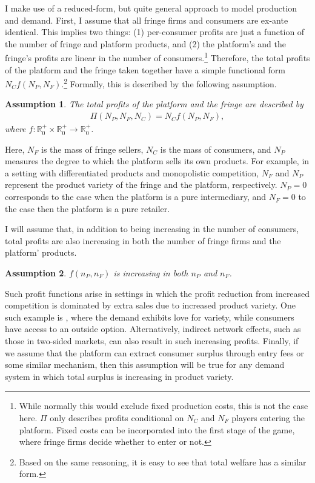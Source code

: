 \documentclass[a4paper]{article}
\newtheorem{assumption}{Assumption}
\begin{document}
I make use of a reduced-form, but quite general approach to model production and demand.
First, I assume that all fringe firms and consumers are ex-ante identical.
This implies two things: (1) per-consumer profits are just a function of the number of fringe and platform products, and (2) the platform's and the fringe's profits are linear in the number of consumers.\footnote{
    While normally this would exclude fixed production costs, this is not the case here.
    $\Pi$ only describes profits conditional on $N_C$ and $N_F$ players entering the platform.
    Fixed costs can be incorporated into the first stage of the game, where fringe firms decide whether to enter or not.
}
Therefore, the total profits of the platform and the fringe taken together have a simple functional form $N_C f(N_P, N_F)$.\footnote{
    Based on the same reasoning, it is easy to see that total welfare has a similar form.
}
Formally, this is described by the following assumption.
\begin{assumption}
    \label{ass:identical_fringe}
    The total profits of the platform and the fringe are described by 
    \begin{align*}
        \Pi(N_P, N_F, N_C) = N_C f(N_P, N_F),
    \end{align*}
    where $f: \mathbb{R}^+_0 \times \mathbb{R}^+_0 \to \mathbb{R}^+_0$.
\end{assumption}
Here, $N_F$ is the mass of fringe sellers, $N_C$ is the mass of consumers, and $N_P$ measures the degree to which the platform sells its own products.
For example, in a setting with differentiated products and monopolistic competition, $N_F$ and $N_P$ represent the product variety of the fringe and the platform, respectively.
$N_P = 0$ corresponds to the case when the platform is a pure intermediary, and $N_F = 0$ to the case then the platform is a pure retailer.

I will assume that, in addition to being increasing in the number of consumers, total profits are also increasing in both the number of fringe firms and the platform' products.
\begin{assumption}
    \label{ass:monotone_profits}
    $f(n_P, n_F)$ is increasing in both $n_P$ and $n_F$.
\end{assumption}
Such profit functions arise in settings in which the profit reduction from increased competition is dominated by extra sales due to increased product variety.
One such example is \textcite{anderson2020aggregative}, where the demand exhibits love for variety, while consumers have access to an outside option.
Alternatively, indirect network effects, such as those in two-sided markets, can also result in such increasing profits.
Finally, if we assume that the platform can extract consumer surplus through entry fees or some similar mechanism, then this assumption will be true for any demand system in which total surplus is increasing in product variety.
\end{document}

